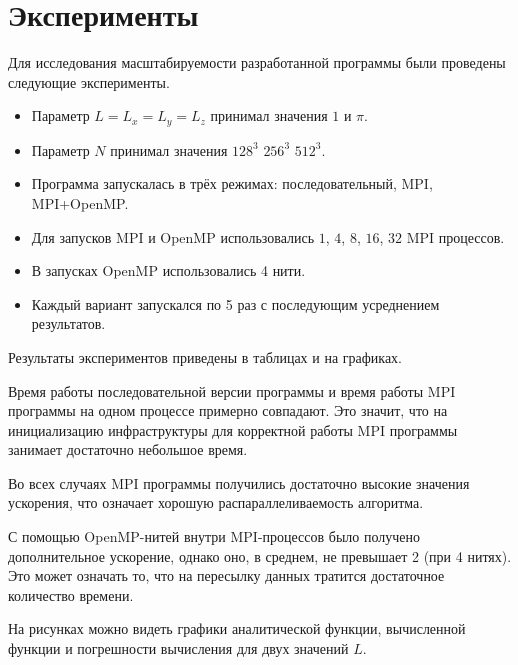 \section{Эксперименты}
\label{sec:Results} 

Для исследования масштабируемости разработанной программы были проведены следующие эксперименты.

\begin{itemize}
    \item Параметр $L = L_x = L_y = L_z$ принимал значения $1$ и $\pi$.
    \item Параметр $N$ принимал значения $128^3$ $256^3$ $512^3$.
    \item Программа запускалась в трёх режимах: последовательный, MPI, MPI+OpenMP.
    \item Для запусков MPI и OpenMP использовались $1$, $4$, $8$, $16$, $32$ MPI процессов.
    \item В запусках OpenMP использовались 4 нити.
    \item Каждый вариант запускался по 5 раз с последующим усреднением результатов.
\end{itemize}

Результаты экспериментов приведены в таблицах и на графиках.

Время работы последовательной версии программы и время работы MPI программы на одном процессе примерно совпадают.
Это значит, что на инициализацию инфраструктуры для корректной работы MPI программы занимает достаточно небольшое время.

Во всех случаях MPI программы получились достаточно высокие значения ускорения, что означает хорошую распараллеливаемость алгоритма.

С помощью OpenMP-нитей внутри MPI-процессов было получено дополнительное ускорение, однако оно, в среднем, не превышает 2 (при 4 нитях).
Это может означать то, что на пересылку данных тратится достаточное количество времени.

На рисунках можно видеть графики аналитической функции, вычисленной функции и погрешности вычисления для двух значений $L$.
